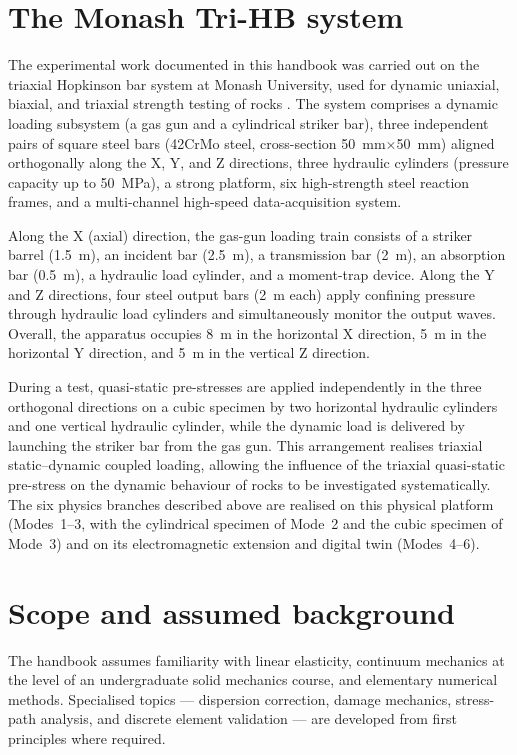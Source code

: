 \documentclass[11pt,a4paper,openany]{book}
\providecommand{\SI}[2]{\qty{#1}{#2}}
\theoremstyle{handbook}
\begin{document}
\section{The Monash Tri-HB system}\label{sec:monash-trihb}

The experimental work documented in this handbook was carried out on the
triaxial Hopkinson bar system at Monash University, used for dynamic
uniaxial, biaxial, and triaxial strength testing of rocks
\cite{Liu2019,Zhang2019Tri}. The system comprises a dynamic loading
subsystem (a gas gun and a cylindrical striker bar), three independent pairs
of square steel bars (42CrMo steel, cross-section
\SI{50}{mm}$\times$\SI{50}{mm}) aligned orthogonally along the X, Y, and Z
directions, three hydraulic cylinders (pressure capacity up to \SI{50}{MPa}),
a strong platform, six high-strength steel reaction frames, and a
multi-channel high-speed data-acquisition system.

Along the X (axial) direction, the gas-gun loading train consists of a
striker barrel (\SI{1.5}{m}), an incident bar (\SI{2.5}{m}), a transmission
bar (\SI{2}{m}), an absorption bar (\SI{0.5}{m}), a hydraulic load cylinder,
and a moment-trap device. Along the Y and Z directions, four steel output
bars (\SI{2}{m} each) apply confining pressure through hydraulic load
cylinders and simultaneously monitor the output waves. Overall, the
apparatus occupies \SI{8}{m} in the horizontal X direction, \SI{5}{m} in the
horizontal Y direction, and \SI{5}{m} in the vertical Z direction.

During a test, quasi-static pre-stresses are applied independently in the
three orthogonal directions on a cubic specimen by two horizontal hydraulic
cylinders and one vertical hydraulic cylinder, while the dynamic load is
delivered by launching the striker bar from the gas gun. This arrangement
realises triaxial static--dynamic coupled loading, allowing the influence of
the triaxial quasi-static pre-stress on the dynamic behaviour of rocks to be
investigated systematically. The six physics branches described above are
realised on this physical platform (Modes~1--3, with the cylindrical
specimen of Mode~2 and the cubic specimen of Mode~3) and on its
electromagnetic extension and digital twin (Modes~4--6).

\section{Scope and assumed background}

The handbook assumes familiarity with linear elasticity, continuum mechanics
at the level of an undergraduate solid mechanics course, and elementary
numerical methods. Specialised topics --- dispersion correction, damage
mechanics, stress-path analysis, and discrete element validation --- are
developed from first principles where required.
\end{document}
